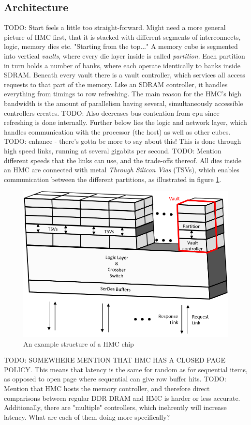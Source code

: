 \subsection{Architecture}
TODO: Start feels a little too straight-forward. Might need a more general picture of HMC first, that it is stacked with different segments of interconnects, logic, memory dies etc. "Starting from the top..."
A memory cube is segmented into vertical \emph{vaults}, where every die layer inside is called \emph{partition}. Each partition in turn holds a number of banks, where each operate identically to banks inside SDRAM. Beneath every vault there is a vault controller, which services all access requests to that part of the memory. Like an SDRAM controller, it handles everything from timings to row refreshing. The main reason for the HMC's high bandwidth is the amount of parallelism having several, simultaneously accessible controllers creates. TODO: Also decreases bus contention from cpu since refreshing is done internally. Further below lies the logic and network layer, which handles communication with the processor (the host) as well as other cubes. TODO: enhance - there's gotta be more to say about this! This is done through high speed links, running at several gigabits per second. TODO: Mention different speeds that the links can use, and the trade-offs thereof. All dies inside an HMC are connected with metal \emph{Through Silicon Vias} (TSVs), which enables communication between the different partitions, as illustrated in figure \ref{HMC-structure}. 
\bigskip

\begin{figure}[h!]
\centering
\includegraphics[width=0.75\linewidth]{figure/HMC_structures.png}
\caption{An example structure of a HMC chip }
\label{HMC-structure}
\end{figure}

TODO: SOMEWHERE MENTION THAT HMC HAS A CLOSED PAGE POLICY. This means that latency is the same for random as for sequential items, as opposed to open page where sequential can give row buffer hits.
TODO: Mention that HMC hosts the memory controller, and therefore direct comparisons between regular DDR DRAM and HMC is harder or less accurate. Additionally, there are "multiple" controllers, which inehrently will increase latency. What are each of them doing more specifically?


